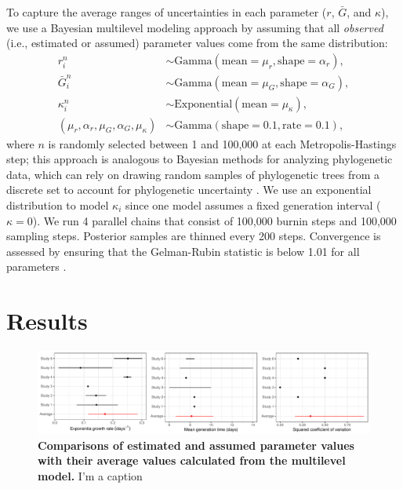 \documentclass[12pt]{article}
\begin{document}
To capture the average ranges of uncertainties in each parameter ($r$, $\bar G$, and $\kappa$),
we use a Bayesian multilevel modeling approach by assuming that all \emph{observed} (i.e., estimated or assumed) parameter values come from the same distribution:
\begin{equation}
\begin{aligned}
r_i^n &\sim \mathrm{Gamma}(\mathrm{mean}=\mu_r, \mathrm{shape}=\alpha_r),\\
\bar{G}_i^n &\sim \mathrm{Gamma}(\mathrm{mean}=\mu_G, \mathrm{shape}=\alpha_G),\\
\kappa_i^n &\sim \mathrm{Exponential}(\mathrm{mean}=\mu_\kappa),\\
(\mu_r, \alpha_r, \mu_G, \alpha_G, \mu_\kappa) &\sim \mathrm{Gamma}(\mathrm{shape}=0.1, \mathrm{rate}=0.1),
\end{aligned}
\end{equation}
where $n$ is randomly selected between 1 and 100,000 at each Metropolis-Hastings step;
this approach is analogous to Bayesian methods for analyzing phylogenetic data, which can rely on drawing random samples of phylogenetic trees from a discrete set to account for phylogenetic uncertainty \citep{pagel2004bayesian,bedford2014integrating}.
We use an exponential distribution to model $\kappa_i$ since one model assumes a fixed generation interval ($\kappa = 0$).
We run 4 parallel chains that consist of 100,000 burnin steps and 100,000 sampling steps.
Posterior samples are thinned every 200 steps.
Convergence is assessed by ensuring that the Gelman-Rubin statistic is below 1.01 for all parameters \citep{gelman1992inference}.

\section{Results}

\begin{figure}[!ht]
\includegraphics[width=\textwidth]{compare_assumption.pdf}
\caption{
\textbf{Comparisons of estimated and assumed parameter values with their average values calculated from the multilevel model.}
I'm a caption
}
\label{fig:assumption}
\end{figure}
\end{document}
